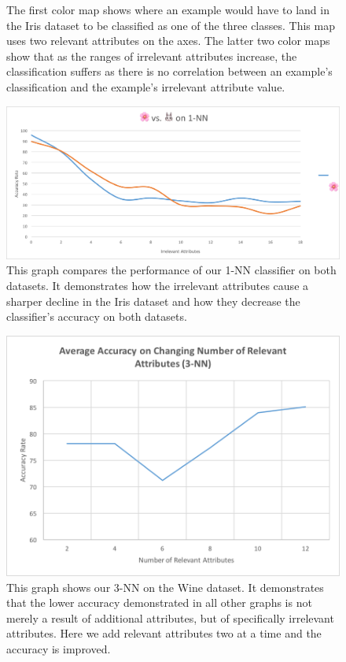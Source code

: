 \documentclass{article}
\begin{document}
\begin{figure}[hbt]
\caption{The first color map shows where an example would have to land in the Iris dataset to be classified as one of the three classes. This map uses two relevant attributes on the axes. The latter two color maps show that as the ranges of irrelevant attributes increase, the classification suffers as there is no correlation between an example's classification and the example's irrelevant attribute value.}
\end{figure}

\begin{figure}[hbt]
\centering
\includegraphics[scale=0.6]{iris-vs-animals} 
\caption{This graph compares the performance of our 1-NN classifier on both datasets. It demonstrates how the irrelevant attributes cause a sharper decline in the Iris dataset and how they decrease the classifier’s accuracy on both datasets.}
\end{figure}

\begin{figure}[hbt]
\centering
\includegraphics[scale=0.7]{wine-accuracy} 
\caption{This graph shows our 3-NN on the Wine dataset. It demonstrates that the lower accuracy demonstrated in all other graphs is not merely a result of additional attributes, but of specifically irrelevant attributes. Here we add relevant attributes two at a time and the accuracy is improved.}
\end{figure}
\end{document}
